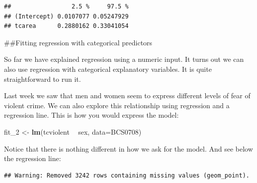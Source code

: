 \documentclass[]{book}
\newenvironment{Shaded}{\begin{snugshade}}{\end{snugshade}}
\newcommand{\DataTypeTok}[1]{\textcolor[rgb]{0.13,0.29,0.53}{#1}}
\newcommand{\DecValTok}[1]{\textcolor[rgb]{0.00,0.00,0.81}{#1}}
\newcommand{\KeywordTok}[1]{\textcolor[rgb]{0.13,0.29,0.53}{\textbf{#1}}}
\newcommand{\NormalTok}[1]{#1}
\newcommand{\OperatorTok}[1]{\textcolor[rgb]{0.81,0.36,0.00}{\textbf{#1}}}
\newcommand{\StringTok}[1]{\textcolor[rgb]{0.31,0.60,0.02}{#1}}
\theoremstyle{definition}
\theoremstyle{definition}
\theoremstyle{definition}
\theoremstyle{remark}
\begin{document}
\begin{verbatim}
##                 2.5 %     97.5 %
## (Intercept) 0.0107077 0.05247929
## tcarea      0.2880162 0.33041054
\end{verbatim}

\#\#Fitting regression with categorical predictors

So far we have explained regression using a numeric input. It turns out
we can also use regression with categorical explanatory variables. It is
quite straightforward to run it.

Last week we saw that men and women seem to express different levels of
fear of violent crime. We can also explore this relationship using
regression and a regression line. This is how you would express the
model:

\begin{Shaded}
\begin{Highlighting}[]
\NormalTok{fit_}\DecValTok{2}\NormalTok{ <-}\StringTok{ }\KeywordTok{lm}\NormalTok{(tcviolent }\OperatorTok{~}\StringTok{ }\NormalTok{sex, }\DataTypeTok{data=}\NormalTok{BCS0708)}
\end{Highlighting}
\end{Shaded}

Notice that there is nothing different in how we ask for the model. And
see below the regression line:

\begin{Shaded}
\end{Shaded}

\begin{verbatim}
## Warning: Removed 3242 rows containing missing values (geom_point).
\end{verbatim}
\end{document}
